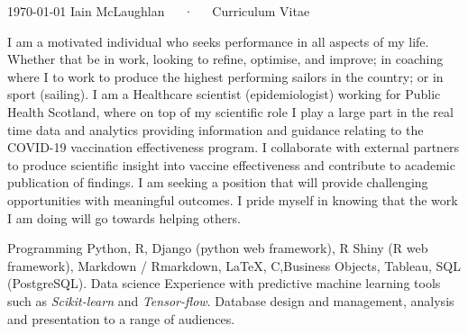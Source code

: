 \documentclass[11pt, a4paper]{awesome-cv}
\begin{document}
\makecvheader
\makecvfooter
  {\today}
  {Iain McLaughlan~~~·~~~Curriculum Vitae}
  {\thepage}
  


\begin{cvparagraph}
I am a motivated individual who seeks performance in all aspects of my life. Whether that be in work, looking to refine, optimise, and improve; in coaching where I to work to produce the highest performing sailors in the country; or in sport (sailing).\newline
I am a Healthcare scientist (epidemiologist) working for Public Health Scotland, where on top of my scientific role I play a large part in the real time data and analytics providing information and guidance relating to the COVID-19 vaccination effectiveness program. I collaborate with external partners to produce scientific insight into vaccine effectiveness and contribute to academic publication of findings.\newline
I am seeking a position that will provide challenging opportunities with meaningful outcomes. I pride myself in knowing that the work I am doing will go towards helping others.  
\end{cvparagraph}


\begin{cvskills}
  \cvskill
    {Programming} %
    {Python, R, Django (python web framework), R Shiny (R web framework), Markdown / Rmarkdown, LaTeX, C,\newline Business Objects, Tableau, SQL (PostgreSQL).} %
  \cvskill
    {Data science}
    {Experience with predictive machine learning tools such as \textit{Scikit-learn} and \textit{Tensor-flow}. Database design and management, analysis and presentation to a range of audiences.}

\end{cvskills}




\end{document}
